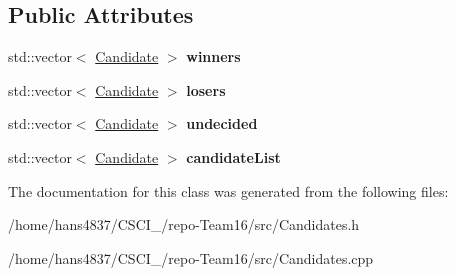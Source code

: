 \subsection*{Public Attributes}
\begin{DoxyCompactItemize}
\item 
\mbox{\label{classCandidates_a524fbccad98042e87cb439ad6a23a121}} 
std\+::vector$<$ \hyperlink{classCandidate}{Candidate} $>$ {\bfseries winners}
\item 
\mbox{\label{classCandidates_afa9e0ea758c1ce3480ce370c81d2f2d5}} 
std\+::vector$<$ \hyperlink{classCandidate}{Candidate} $>$ {\bfseries losers}
\item 
\mbox{\label{classCandidates_a12aafec4ca785542ae4408fbe11c2bd0}} 
std\+::vector$<$ \hyperlink{classCandidate}{Candidate} $>$ {\bfseries undecided}
\item 
\mbox{\label{classCandidates_ac7a165f3d34b29981576e63d94ef9e6e}} 
std\+::vector$<$ \hyperlink{classCandidate}{Candidate} $>$ {\bfseries candidate\+List}
\end{DoxyCompactItemize}


The documentation for this class was generated from the following files\+:\begin{DoxyCompactItemize}
\item 
/home/hans4837/\+C\+S\+C\+I\+\_/repo-\/\+Team16/src/Candidates.\+h\item 
/home/hans4837/\+C\+S\+C\+I\+\_/repo-\/\+Team16/src/Candidates.\+cpp\end{DoxyCompactItemize}
